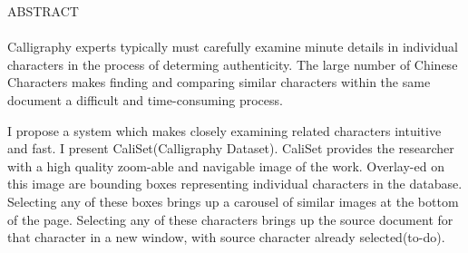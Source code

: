 ABSTRACT\\
\\
Calligraphy experts typically must carefully examine minute details in individual characters in the process of determing authenticity.  The large number of Chinese Characters makes finding and comparing similar characters within the same document a difficult and time-consuming process.

I propose a system which makes closely examining related characters intuitive and fast.  I present CaliSet(Calligraphy Dataset).  CaliSet provides the researcher with a high quality zoom-able and navigable image of the work.  Overlay-ed on this image are bounding boxes representing individual characters in the database.  Selecting any of these boxes brings up a carousel of similar images at the bottom of the page.  Selecting any of these characters brings up the source document for that character in a new window, with source character already selected(to-do).  

\newpage
